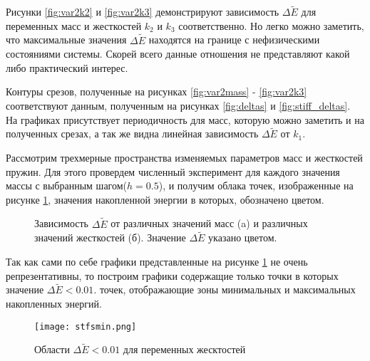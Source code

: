 Рисунки  \ref{fig:var2k2} и \ref{fig:var2k3} демонстрируют зависимость $\Delta \tilde{E}$ для переменных масс и жесткостей $k_2$ и $k_3$ соответственно. Но легко можно заметить, что максимальные значения $\Delta \tilde{E}$ находятся на границе с нефизическими состояниями системы. Скорей всего данные отношения не представляют какой либо практический интерес.

Контуры срезов, полученные на рисунках \ref{fig:var2mass} - \ref{fig:var2k3} соответствуют данным, полученным на рисунках \ref{fig:deltas} и \ref{fig:stiff_deltas}. На графиках присутствует периодичность для масс, которую можно заметить и на полученных срезах, а так же видна линейная зависимость $\Delta \tilde{E}$ от $k_1$.

Рассмотрим трехмерные пространства изменяемых параметров масс и жесткостей пружин. Для этого провердем численный эксперимент для каждого значения массы
с выбранным шагом($h=0.5$), и получим облака точек, изображенные на рисунке \ref{fig:3d}, значения накопленной энергии в которых, обозначено цветом.


\begin{figure}[b!]
    \centering
    \begin{minipage}[h]{0.49\linewidth}
    \end{minipage}
    \hfill
    \begin{minipage}[h]{0.49\linewidth}
    \end{minipage}
    \caption{Зависимость $\Delta \tilde{E}$ от различных значений масс (a) и различных значений жесткостей (б). Значение $\Delta \tilde{E}$ указано цветом.}
    \label{fig:3d}
\end{figure}

Так как сами по себе графики представленные на рисунке \ref{fig:3d} не очень репрезентативны, то построим графики содержащие только точки в которых значение $\Delta \tilde{E} < 0.01$. 
точек, отображающие зоны минимальных и максимальных накопленных энергий. 

\begin{figure}[b!]
    \centering
    \texttt{[image: stfsmin.png]}
    \caption{Области $\Delta \tilde{E} < 0.01$  для переменных жесктостей}
    \label{minmss3d}
\end{figure}


